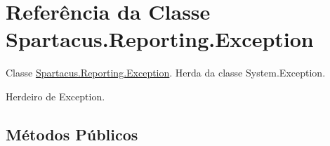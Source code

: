 \hypertarget{classSpartacus_1_1Reporting_1_1Exception}{\section{Referência da Classe Spartacus.\+Reporting.\+Exception}
\label{classSpartacus_1_1Reporting_1_1Exception}
}


Classe \hyperlink{classSpartacus_1_1Reporting_1_1Exception}{Spartacus.\+Reporting.\+Exception}. Herda da classe System.\+Exception.  




Herdeiro de Exception.

\subsection*{Métodos Públicos}
